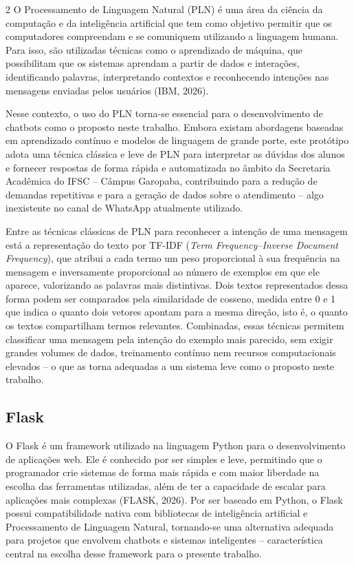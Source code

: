 \documentclass[10pt]{article}
\begin{document}
\begin{multicols}{2}
O Processamento de Linguagem Natural (PLN) é uma área da ciência da
computação e da inteligência artificial que tem como objetivo permitir
que os computadores compreendam e se comuniquem utilizando a linguagem
humana. Para isso, são utilizadas técnicas como o aprendizado de máquina,
que possibilitam que os sistemas aprendam a partir de dados e interações,
identificando palavras, interpretando contextos e reconhecendo intenções
nas mensagens enviadas pelos usuários (IBM, 2026).

Nesse contexto, o uso do PLN torna-se essencial para o desenvolvimento de
chatbots como o proposto neste trabalho. Embora existam abordagens
baseadas em aprendizado contínuo e modelos de linguagem de grande porte,
este protótipo adota uma técnica clássica e leve de PLN para interpretar
as dúvidas dos alunos e fornecer respostas de forma rápida e
automatizada no âmbito da Secretaria Acadêmica do IFSC -- Câmpus
Garopaba, contribuindo para a redução de demandas repetitivas e para a
geração de dados sobre o atendimento -- algo inexistente no canal de
WhatsApp atualmente utilizado.

Entre as técnicas clássicas de PLN para reconhecer a intenção de uma
mensagem está a representação do texto por TF-IDF (\textit{Term
Frequency--Inverse Document Frequency}), que atribui a cada termo um peso
proporcional à sua frequência na mensagem e inversamente proporcional ao
número de exemplos em que ele aparece, valorizando as palavras mais
distintivas. Dois textos representados dessa forma podem ser comparados
pela similaridade de cosseno, medida entre 0 e 1 que indica o quanto dois
vetores apontam para a mesma direção, isto é, o quanto os textos
compartilham termos relevantes. Combinadas, essas técnicas permitem
classificar uma mensagem pela intenção do exemplo mais parecido, sem
exigir grandes volumes de dados, treinamento contínuo nem recursos
computacionais elevados -- o que as torna adequadas a um sistema leve
como o proposto neste trabalho.
\subsection{Flask}\label{sec:flask}

O Flask é um framework utilizado na linguagem Python para o
desenvolvimento de aplicações web. Ele é conhecido por ser simples e
leve, permitindo que o programador crie sistemas de forma mais rápida e
com maior liberdade na escolha das ferramentas utilizadas, além de ter a
capacidade de escalar para aplicações mais complexas (FLASK, 2026). Por
ser baseado em Python, o Flask possui compatibilidade nativa com
bibliotecas de inteligência artificial e Processamento de Linguagem
Natural, tornando-se uma alternativa adequada para projetos que envolvem
chatbots e sistemas inteligentes -- característica central na escolha
desse framework para o presente trabalho.


\end{multicols}
\end{document}
